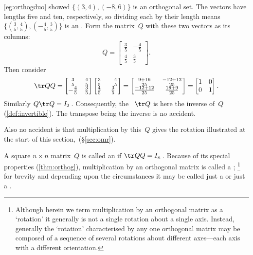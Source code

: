 \begin{example} \label{eg:}
\autoref{eg:orthogduo} showed \(\{(3,4),(-8,6)\}\) is an orthogonal set.  
The vectors have lengths five and ten, respectively, so dividing each by their length means \(\{(\frac35,\frac45),(-\frac45,\frac35)\}\) is an .
Form the matrix~\(Q\) with these two vectors as its columns:
\[Q%
=\begin{bmatrix} \frac35&-\frac45\\\frac45&\frac35 \end{bmatrix}.\]
Then consider
\begin{equation*}
\tr QQ=\begin{bmatrix} \frac35&\frac45\\-\frac45&\frac35 \end{bmatrix}
\begin{bmatrix} \frac35&-\frac45\\\frac45&\frac35 \end{bmatrix}
=\begin{bmatrix} \frac{9+16}{25}&\frac{-12+12}{25}\\
\frac{-12+12}{25}&\frac{16+9}{25} \end{bmatrix}
=\begin{bmatrix} 1&0\\0&1 \end{bmatrix}.
\end{equation*}
Similarly \(Q\tr Q=I_2\)\,.
Consequently, the ~\(\tr Q\) is here the inverse of~\(Q\) (\autoref{def:invertible}).  
The transpose being the inverse is no accident.

Also no accident is that multiplication by this~\(Q\) gives the rotation illustrated at the start of this section,~(\S\ref{sec:omr}).
\end{example}




\begin{comment}
Could change this definition to $Q$~is {invertible} and $Q^{-1}=\tr Q$.  Then prove equivalence.  Use this for now.
\end{comment}

\begin{definition} \label{def:orthog} 
A square \(n\times n\) matrix~\(Q\) is called an  if \(\tr QQ=I_n\)\,.
Because of its special properties (\autoref{thm:orthog}),
multiplication by an orthogonal matrix is called a ;  
\footnote{Although herein we term multiplication by an orthogonal matrix as a `rotation' it generally is not a single rotation about a single axis.  
Instead, generally the `rotation' characterised by any one orthogonal matrix may be composed of a sequence of several rotations about different axes---each axis with a different orientation.}
for brevity and depending upon the circumstances it may be called just a  or just a .
\end{definition}





